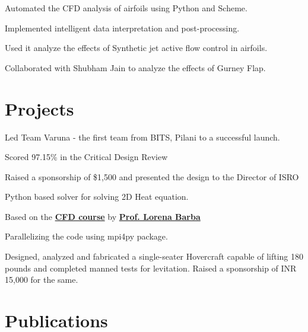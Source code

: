 \documentclass[]{resume}
\begin{document}
\begin{minipage}[t]{0.66\textwidth}
\begin{tightemize}
\item Automated the CFD analysis of airfoils using Python and Scheme.
\item Implemented intelligent data interpretation and post-processing.
\item Used it analyze the effects of Synthetic jet active flow control in airfoils.
\item Collaborated with Shubham Jain to analyze the effects of Gurney Flap.
\end{tightemize}
\sectionsep


\section{Projects}
\begin{tightemize}
\item Led Team Varuna - the first team from BITS, Pilani to a successful launch.
\item Scored 97.15\% in the Critical Design Review
\item Raised a sponsorship of \$1,500 and presented the design to the Director of ISRO
\end{tightemize}
\sectionsep

\begin{tightemize}
\item Python based solver for solving 2D Heat equation.
\item Based on the \textbf{\href{https://itunes.apple.com/us/itunes-u/computational-fluid-dynamics/id452560554?mt=10}
		{CFD course}} by \textbf{\href{http://lorenabarba.com}{Prof. Lorena Barba}}
\item Parallelizing the code using mpi4py package.
\end{tightemize}
\sectionsep

Designed, analyzed and fabricated a single-seater Hovercraft capable of lifting 180 pounds and completed manned
tests for levitation. Raised a sponsorship of INR 15,000 for the same.


\section{Publications}
\renewcommand\refname{\vskip -1.5cm} %


\nocite{*}

\end{minipage}
\end{document}
